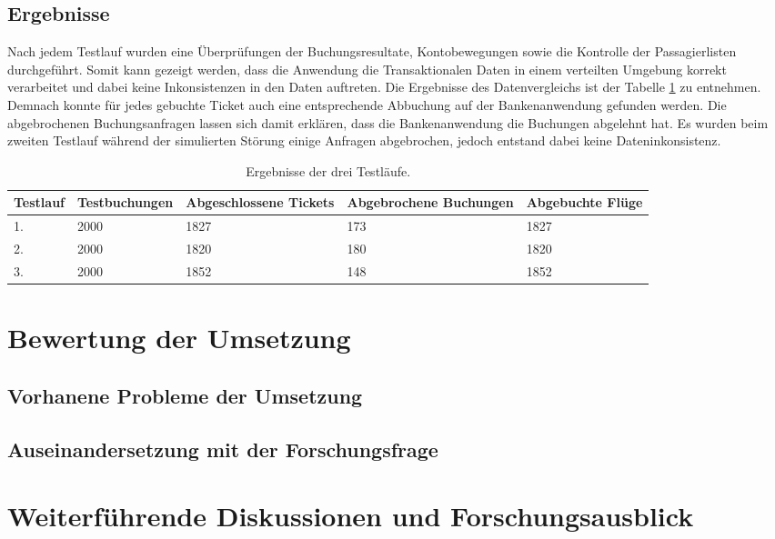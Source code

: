 \subsection{Ergebnisse}
Nach jedem Testlauf wurden eine Überprüfungen der Buchungsresultate, Kontobewegungen sowie die Kontrolle der Passagierlisten durchgeführt. Somit kann gezeigt werden, dass die Anwendung die Transaktionalen Daten in einem verteilten Umgebung korrekt verarbeitet und dabei keine Inkonsistenzen in den Daten auftreten. Die Ergebnisse des Datenvergleichs ist der Tabelle \ref{tab:evaluation:resultsTestRuns} zu entnehmen. Demnach konnte für jedes gebuchte Ticket auch eine entsprechende Abbuchung auf der Bankenanwendung gefunden werden. Die abgebrochenen Buchungsanfragen lassen sich damit erklären, dass die Bankenanwendung die Buchungen abgelehnt hat. Es wurden beim zweiten Testlauf während der simulierten Störung einige Anfragen abgebrochen, jedoch entstand dabei keine Dateninkonsistenz.
\begin{table}
    \centering
    \begin{tabular}{p{2 cm} p{2.5 cm} p{2.5 cm} p{2.5 cm} p{2.5 cm}}
        Testlauf    & Testbuchungen       &   Abgeschlossene Tickets & Abgebrochene Buchungen & Abgebuchte Flüge  \\ \hline
            1.      & 2000                &         1827             &      173               &         1827        \\
            2.      & 2000                &         1820             &      180               &         1820        \\
            3.      & 2000                &         1852             &      148               &         1852        
    \end{tabular}
    \caption{Ergebnisse der drei Testläufe.}
    \label{tab:evaluation:resultsTestRuns}
\end{table}

\section{Bewertung der Umsetzung}
\label{cha:rating}

\subsection{Vorhanene Probleme der Umsetzung}

\subsection{Auseinandersetzung mit der Forschungsfrage}

\section{Weiterführende Diskussionen und Forschungsausblick}
 